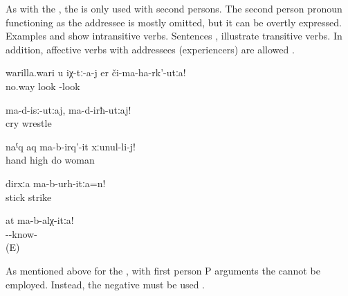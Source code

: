As with the , the  is only used with second persons. The second person pronoun functioning as the addressee is mostly omitted, but it can be overtly expressed. Examples  and  show intransitive verbs. Sentences ,  illustrate transitive verbs. In addition, affective verbs with  addressees (experiencers) are allowed .

\begin{exe}
	\ex	\label{ex:No way you look at them}
	\gll	warilla.wari	u	iχ-tː-a-j	er	či-ma-ha-rk'-utːa!\\
		no.way			look	-look\\
	\glt	{}

	\ex	\label{ex:Do not cry, do not wrestle}
	\gll	ma-d-isː-utːaj,		ma-d-irħ-utːaj!\\
		cry	wrestle\\
	\glt	{}

	\ex	\label{ex:Do not raise your hand against your wife}
	\gll	naˁq	aq	ma-b-irq'-it	xːunul-li-j!\\
		hand	high	do	woman\\
	\glt	{}

	\ex	\label{ex:Do not hit with a stick}
	\gll	dirxːa	ma-b-urh-itːa=n!\\
		stick	strike\\
	\glt	{}

	\ex	\label{ex:Do not know this}
	\gll	at	ma-b-alχ-itːa!\\
			--know-\\
	\glt	{} (E)
\end{exe}

As mentioned above for the , with first person P arguments the  cannot be employed. Instead, the negative  must be used .

